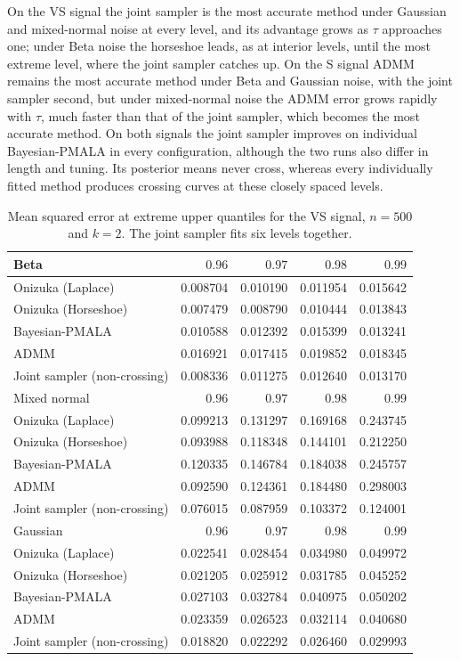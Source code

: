 On the VS signal the joint sampler is the most accurate method under Gaussian and mixed-normal noise at every level, and its advantage grows as $\tau$ approaches one; under Beta noise the horseshoe leads, as at interior levels, until the most extreme level, where the joint sampler catches up. On the S signal ADMM remains the most accurate method under Beta and Gaussian noise, with the joint sampler second, but under mixed-normal noise the ADMM error grows rapidly with $\tau$, much faster than that of the joint sampler, which becomes the most accurate method. On both signals the joint sampler improves on individual Bayesian-PMALA in every configuration, although the two runs also differ in length and tuning. Its posterior means never cross, whereas every individually fitted method produces crossing curves at these closely spaced levels.

\begin{table}[!htbp]
\centering
\small
\caption{Mean squared error at extreme upper quantiles for the VS signal, $n=500$ and $k=2$. The joint sampler fits six levels together.}
\label{tab:vs_ext_upper_mse}
\begin{tabular}{lrrrr}
\toprule
Beta & $0.96$ & $0.97$ & $0.98$ & $0.99$ \\
\midrule
Onizuka (Laplace) & 0.008704 & 0.010190 & 0.011954 & 0.015642 \\
Onizuka (Horseshoe) & 0.007479 & 0.008790 & 0.010444 & 0.013843 \\
Bayesian-PMALA & 0.010588 & 0.012392 & 0.015399 & 0.013241 \\
ADMM & 0.016921 & 0.017415 & 0.019852 & 0.018345 \\
Joint sampler (non-crossing) & 0.008336 & 0.011275 & 0.012640 & 0.013170 \\
\midrule
Mixed normal & $0.96$ & $0.97$ & $0.98$ & $0.99$ \\
\midrule
Onizuka (Laplace) & 0.099213 & 0.131297 & 0.169168 & 0.243745 \\
Onizuka (Horseshoe) & 0.093988 & 0.118348 & 0.144101 & 0.212250 \\
Bayesian-PMALA & 0.120335 & 0.146784 & 0.184038 & 0.245757 \\
ADMM & 0.092590 & 0.124361 & 0.184480 & 0.298003 \\
Joint sampler (non-crossing) & 0.076015 & 0.087959 & 0.103372 & 0.124001 \\
\midrule
Gaussian & $0.96$ & $0.97$ & $0.98$ & $0.99$ \\
\midrule
Onizuka (Laplace) & 0.022541 & 0.028454 & 0.034980 & 0.049972 \\
Onizuka (Horseshoe) & 0.021205 & 0.025912 & 0.031785 & 0.045252 \\
Bayesian-PMALA & 0.027103 & 0.032784 & 0.040975 & 0.050202 \\
ADMM & 0.023359 & 0.026523 & 0.032114 & 0.040680 \\
Joint sampler (non-crossing) & 0.018820 & 0.022292 & 0.026460 & 0.029993 \\
\bottomrule
\end{tabular}
\end{table}

